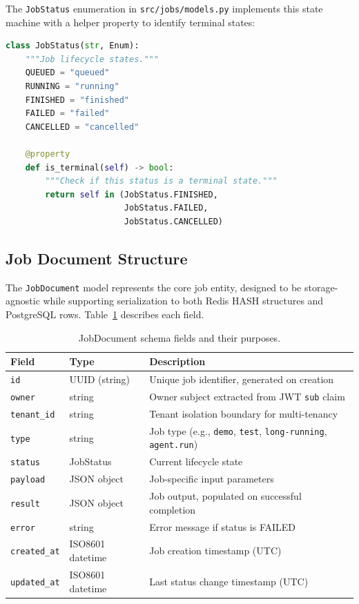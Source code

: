 The \texttt{JobStatus} enumeration in \texttt{src/jobs/models.py} implements this state machine with a helper property to identify terminal states:

\begin{lstlisting}[language=Python, caption={Job status enumeration with terminal state detection.}]
class JobStatus(str, Enum):
    """Job lifecycle states."""
    QUEUED = "queued"
    RUNNING = "running"
    FINISHED = "finished"
    FAILED = "failed"
    CANCELLED = "cancelled"

    @property
    def is_terminal(self) -> bool:
        """Check if this status is a terminal state."""
        return self in (JobStatus.FINISHED, 
                        JobStatus.FAILED, 
                        JobStatus.CANCELLED)
\end{lstlisting}

\subsection{Job Document Structure}
\label{subsec:job-document-structure}

The \texttt{JobDocument} model represents the core job entity, designed to be storage-agnostic while supporting serialization to both Redis HASH structures and PostgreSQL rows. Table~\ref{tab:job-document-fields} describes each field.

\begin{table}[ht]
\centering
\caption{JobDocument schema fields and their purposes.}
\label{tab:job-document-fields}
\small
\begin{tabular}{llp{6.5cm}}
\hline
\textbf{Field} & \textbf{Type} & \textbf{Description} \\
\hline
\texttt{id} & UUID (string) & Unique job identifier, generated on creation \\
\texttt{owner} & string & Owner subject extracted from JWT \texttt{sub} claim \\
\texttt{tenant\_id} & string & Tenant isolation boundary for multi-tenancy \\
\texttt{type} & string & Job type (e.g., \texttt{demo}, \texttt{test}, \texttt{long-running}, \texttt{agent.run}) \\
\texttt{status} & JobStatus & Current lifecycle state \\
\texttt{payload} & JSON object & Job-specific input parameters \\
\texttt{result} & JSON object & Job output, populated on successful completion \\
\texttt{error} & string & Error message if status is FAILED \\
\texttt{created\_at} & ISO8601 datetime & Job creation timestamp (UTC) \\
\texttt{updated\_at} & ISO8601 datetime & Last status change timestamp (UTC) \\
\hline
\end{tabular}
\end{table}

